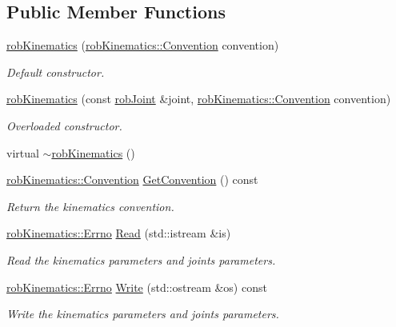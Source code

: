 \subsection*{Public Member Functions}
\begin{DoxyCompactItemize}
\item 
\hyperlink{classrob_kinematics_a0f56a8fda948108fb7e3319d9f252264}{rob\+Kinematics} (\hyperlink{classrob_kinematics_a298703e920da583d1f6aa60c8f65ca78}{rob\+Kinematics\+::\+Convention} convention)
\begin{DoxyCompactList}\small\item\em Default constructor. \end{DoxyCompactList}\item 
\hyperlink{classrob_kinematics_a958b1b337dd1dfc9529af6756803f1a5}{rob\+Kinematics} (const \hyperlink{classrob_joint}{rob\+Joint} \&joint, \hyperlink{classrob_kinematics_a298703e920da583d1f6aa60c8f65ca78}{rob\+Kinematics\+::\+Convention} convention)
\begin{DoxyCompactList}\small\item\em Overloaded constructor. \end{DoxyCompactList}\item 
virtual \hyperlink{classrob_kinematics_aecaa7ea272fa769c80e322a4e85d9e52}{$\sim$rob\+Kinematics} ()
\item 
\hyperlink{classrob_kinematics_a298703e920da583d1f6aa60c8f65ca78}{rob\+Kinematics\+::\+Convention} \hyperlink{classrob_kinematics_a9f60e9d388339a67afda4ea108e58b0b}{Get\+Convention} () const 
\begin{DoxyCompactList}\small\item\em Return the kinematics convention. \end{DoxyCompactList}\item 
\hyperlink{classrob_joint_a6656cb0c2f8c9aadf0c446abd6bebed7}{rob\+Kinematics\+::\+Errno} \hyperlink{classrob_kinematics_a914647c840e02cc10eaa1fe90dc29ac9}{Read} (std\+::istream \&is)
\begin{DoxyCompactList}\small\item\em Read the kinematics parameters and joints parameters. \end{DoxyCompactList}\item 
\hyperlink{classrob_joint_a6656cb0c2f8c9aadf0c446abd6bebed7}{rob\+Kinematics\+::\+Errno} \hyperlink{classrob_kinematics_a0d286834b4f10f80da0af230aadaf154}{Write} (std\+::ostream \&os) const 
\begin{DoxyCompactList}\small\item\em Write the kinematics parameters and joints parameters. \end{DoxyCompactList}\item 

\end{DoxyCompactItemize}
